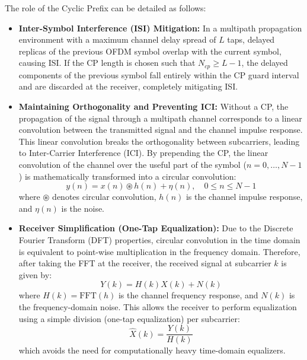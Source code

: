 \documentclass[a4paper]{article}
\begin{document}
The role of the Cyclic Prefix can be detailed as follows:
\begin{itemize}
    \item \textbf{Inter-Symbol Interference (ISI) Mitigation:} In a multipath propagation environment with a maximum channel delay spread of $L$ taps, delayed replicas of the previous OFDM symbol overlap with the current symbol, causing ISI. If the CP length is chosen such that $N_{cp} \ge L - 1$, the delayed components of the previous symbol fall entirely within the CP guard interval and are discarded at the receiver, completely mitigating ISI.
    \item \textbf{Maintaining Orthogonality and Preventing ICI:} Without a CP, the propagation of the signal through a multipath channel corresponds to a linear convolution between the transmitted signal and the channel impulse response. This linear convolution breaks the orthogonality between subcarriers, leading to Inter-Carrier Interference (ICI). By prepending the CP, the linear convolution of the channel over the useful part of the symbol ($n = 0, \dots, N-1$) is mathematically transformed into a circular convolution:
    \begin{equation}
    y(n) = x(n) \circledast h(n) + \eta(n), \quad 0 \le n \le N-1
    \end{equation}
    where $\circledast$ denotes circular convolution, $h(n)$ is the channel impulse response, and $\eta(n)$ is the noise.
    \item \textbf{Receiver Simplification (One-Tap Equalization):} Due to the Discrete Fourier Transform (DFT) properties, circular convolution in the time domain is equivalent to point-wise multiplication in the frequency domain. Therefore, after taking the FFT at the receiver, the received signal at subcarrier $k$ is given by:
    \begin{equation}
    Y(k) = H(k)X(k) + N(k)
    \end{equation}
    where $H(k) = \text{FFT}(h)$ is the channel frequency response, and $N(k)$ is the frequency-domain noise. This allows the receiver to perform equalization using a simple division (one-tap equalization) per subcarrier:
    \begin{equation}
    \hat{X}(k) = \frac{Y(k)}{H(k)}
    \end{equation}
    which avoids the need for computationally heavy time-domain equalizers.
\end{itemize}
\end{document}
